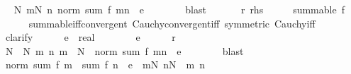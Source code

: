 \begin{isabellebody}
\ \isamarkupfalse%
\ {\isachardoublequoteopen}{\isasymexists}N{\isachardot}{\kern0pt}\ {\isasymforall}m{\isasymge}N{\isachardot}{\kern0pt}\ {\isasymforall}n{\isachardot}{\kern0pt}\ norm\ {\isacharparenleft}{\kern0pt}sum\ f\ {\isacharbraceleft}{\kern0pt}m{\isachardot}{\kern0pt}{\isachardot}{\kern0pt}{\isacharless}{\kern0pt}n{\isacharbraceright}{\kern0pt}{\isacharparenright}{\kern0pt}\ {\isacharless}{\kern0pt}\ e{\isachardoublequoteclose}\isanewline
\ \ \ \ \ \ \isamarkupfalse%
\ blast\isanewline
\ \ \isamarkupfalse%
\isanewline
{}\isamarkupfalse%
\isanewline
\ \ \isamarkupfalse%
\ r{\isacharcolon}{\kern0pt}\ {\isacharquery}{\kern0pt}rhs\isanewline
\ \ \isamarkupfalse%
\ \isamarkupfalse%
\ {\isachardoublequoteopen}summable\ f{\isachardoublequoteclose}\isanewline
\ \ \ \ \isamarkupfalse%
\ summable{\isacharunderscore}{\kern0pt}iff{\isacharunderscore}{\kern0pt}convergent\ Cauchy{\isacharunderscore}{\kern0pt}convergent{\isacharunderscore}{\kern0pt}iff\ {\isacharbrackleft}{\kern0pt}symmetric{\isacharbrackright}{\kern0pt}\ Cauchy{\isacharunderscore}{\kern0pt}iff\isanewline
\ \ \isamarkupfalse%
\ clarify\isanewline
\ \ \ \ \isamarkupfalse%
\ e\ {\isacharcolon}{\kern0pt}{\isacharcolon}{\kern0pt}\ real\isanewline
\ \ \ \ \isamarkupfalse%
\ {\isachardoublequoteopen}{}\ {\isacharless}{\kern0pt}\ e{\isachardoublequoteclose}\isanewline
\ \ \ \ \isamarkupfalse%
\ r\ \isamarkupfalse%
\ N\ \ N{\isacharcolon}{\kern0pt}\ {\isachardoublequoteopen}{\isasymAnd}m\ n{\isachardot}{\kern0pt}\ m\ {\isasymge}\ N\ {\isasymLongrightarrow}\ norm\ {\isacharparenleft}{\kern0pt}sum\ f\ {\isacharbraceleft}{\kern0pt}m{\isachardot}{\kern0pt}{\isachardot}{\kern0pt}{\isacharless}{\kern0pt}n{\isacharbraceright}{\kern0pt}{\isacharparenright}{\kern0pt}\ {\isacharless}{\kern0pt}\ e{\isachardoublequoteclose}\isanewline
\ \ \ \ \ \ \isamarkupfalse%
\ blast\isanewline
\ \ \ \ \isamarkupfalse%
\ {\isachardoublequoteopen}norm\ {\isacharparenleft}{\kern0pt}sum\ f\ {\isacharbraceleft}{\kern0pt}{\isachardot}{\kern0pt}{\isachardot}{\kern0pt}{\isacharless}{\kern0pt}m{\isacharbraceright}{\kern0pt}\ {\isacharminus}{\kern0pt}\ sum\ f\ {\isacharbraceleft}{\kern0pt}{\isachardot}{\kern0pt}{\isachardot}{\kern0pt}{\isacharless}{\kern0pt}n{\isacharbraceright}{\kern0pt}{\isacharparenright}{\kern0pt}\ {\isacharless}{\kern0pt}\ e{\isachardoublequoteclose}\ \ {\isachardoublequoteopen}m{\isasymge}N{\isachardoublequoteclose}\ {\isachardoublequoteopen}n{\isasymge}N{\isachardoublequoteclose}\ \ m\ n\isanewline

\end{isabellebody}
